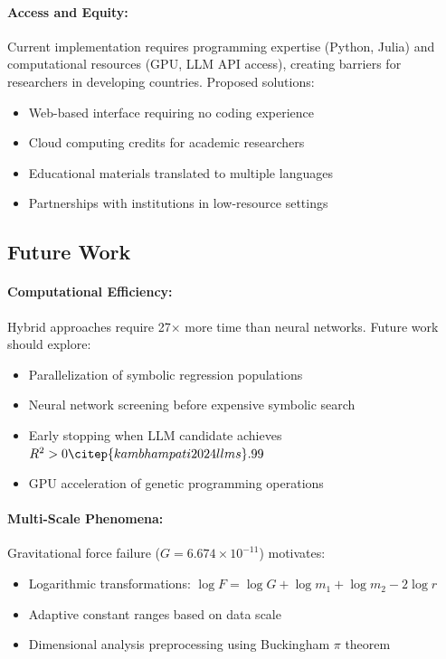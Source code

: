 \documentclass[twoside,11pt]{article}
\begin{document}
\paragraph{Access and Equity:} Current implementation requires programming expertise (Python, Julia) and computational resources (GPU, LLM API access), creating barriers for researchers in developing countries\citet{kambhampati2024llms}. Proposed solutions:
\begin{itemize}
\item Web-based interface requiring no coding experience
\item Cloud computing credits for academic researchers
\item Educational materials translated to multiple languages
\item Partnerships with institutions in low-resource settings
\end{itemize}


\subsection{Future Work}

\paragraph{Computational Efficiency:} Hybrid approaches require 27$\times$ more time than neural networks\citep{zhou2020universality}\citep{liu2020understanding}. Future work should explore:
\begin{itemize}
\item Parallelization of symbolic regression populations\citep{la2021contemporary}
\item Neural network screening before expensive symbolic search
\item Early stopping when LLM candidate achieves $R^2 > 0\citep{kambhampati2024llms}.99$
\item GPU acceleration of genetic programming operations\citep{koza1994genetic}\citep{stephens2018gplearn}
\end{itemize}

\paragraph{Multi-Scale Phenomena:} Gravitational force failure ($G = 6.674 \times 10^{-11}$) motivates:
\begin{itemize}
\item Logarithmic transformations: $\log F = \log G + \log m_1 + \log m_2 - 2\log r$
\item Adaptive constant ranges based on data scale
\item Dimensional analysis preprocessing using Buckingham $\pi$ theorem
\end{itemize}
\end{document}
